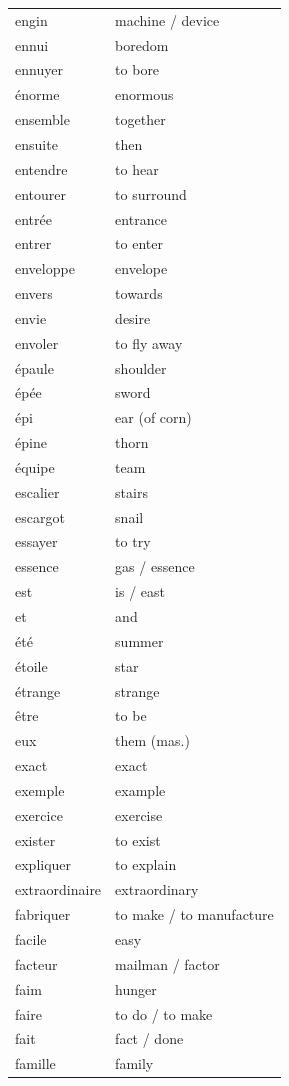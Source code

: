\documentclass[12pt,a4paper]{article}
\begin{document}
\begin{longtable}{p{4cm} p{6cm}}
engin & machine / device \\
ennui & boredom \\
ennuyer & to bore \\
énorme & enormous \\
ensemble & together \\
ensuite & then \\
entendre & to hear \\
entourer & to surround \\
entrée & entrance \\
entrer & to enter \\
enveloppe & envelope \\
envers & towards \\
envie & desire \\
envoler & to fly away \\
épaule & shoulder \\
épée & sword \\
épi & ear (of corn) \\
épine & thorn \\
équipe & team \\
escalier & stairs \\
escargot & snail \\
essayer & to try \\
essence & gas / essence \\
est & is / east \\
et & and \\
été & summer \\
étoile & star \\
étrange & strange \\
être & to be \\
eux & them (mas.) \\
exact & exact \\
exemple & example \\
exercice & exercise \\
exister & to exist \\
expliquer & to explain \\
extraordinaire & extraordinary \\
fabriquer & to make / to manufacture \\
facile & easy \\
facteur & mailman / factor \\
faim & hunger \\
faire & to do / to make \\
fait & fact / done \\
famille & family \\

\end{longtable}
\end{document}

